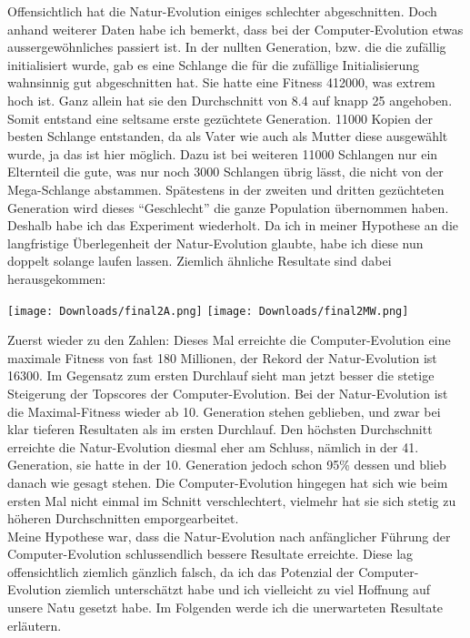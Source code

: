 \documentclass[11pt,a4paper,ngerman]{article}
\begin{document}
Offensichtlich hat die Natur-Evolution einiges schlechter abgeschnitten. Doch anhand weiterer Daten habe ich bemerkt, dass bei der Computer-Evolution etwas aussergewöhnliches passiert ist. In der nullten Generation, bzw. die die zufällig initialisiert wurde, gab es eine Schlange die für die zufällige Initialisierung wahnsinnig gut abgeschnitten hat. Sie hatte eine Fitness 412000, was extrem hoch ist. Ganz allein hat sie den Durchschnitt von 8.4 auf knapp 25 angehoben. Somit entstand eine seltsame erste gezüchtete Generation. 11000 Kopien der besten Schlange entstanden, da als Vater wie auch als Mutter diese ausgewählt wurde, ja das ist hier möglich. Dazu ist bei weiteren 11000 Schlangen nur ein Elternteil die gute, was nur noch 3000 Schlangen übrig lässt, die nicht von der Mega-Schlange abstammen. Spätestens in der zweiten und dritten gezüchteten Generation wird dieses \enquote{Geschlecht} die ganze Population übernommen haben. Deshalb habe ich das Experiment wiederholt. Da ich in meiner Hypothese an die langfristige Überlegenheit der Natur-Evolution glaubte, habe ich diese nun doppelt solange laufen lassen. Ziemlich ähnliche Resultate sind dabei herausgekommen:

\begin{center}
    \texttt{[image: Downloads/final2A.png]}
    \texttt{[image: Downloads/final2MW.png]}
\end{center}

Zuerst wieder zu den Zahlen: Dieses Mal erreichte die Computer-Evolution eine maximale Fitness von fast 180 Millionen, der Rekord der Natur-Evolution ist 16300. Im Gegensatz zum ersten Durchlauf sieht man jetzt besser die stetige Steigerung der Topscores der Computer-Evolution. Bei der Natur-Evolution ist die Maximal-Fitness wieder ab 10. Generation stehen geblieben, und zwar bei klar tieferen Resultaten als im ersten Durchlauf. Den höchsten Durchschnitt erreichte die Natur-Evolution diesmal eher am Schluss, nämlich in der 41. Generation, sie hatte in der 10. Generation jedoch schon 95\% dessen und blieb danach wie gesagt stehen. Die Computer-Evolution hingegen hat sich wie beim ersten Mal nicht einmal im Schnitt verschlechtert, vielmehr hat sie sich stetig zu höheren Durchschnitten emporgearbeitet.\\

Meine Hypothese war, dass die Natur-Evolution nach anfänglicher Führung der Computer-Evolution schlussendlich bessere Resultate erreichte. Diese lag offensichtlich ziemlich gänzlich falsch, da ich das Potenzial der Computer-Evolution ziemlich unterschätzt habe und ich vielleicht zu viel Hoffnung auf unsere Natu gesetzt habe. Im Folgenden werde ich die unerwarteten Resultate erläutern.\\
\end{document}
